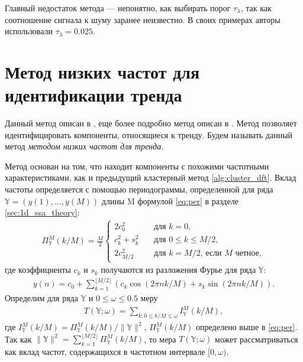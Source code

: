 \documentclass[specialist,
               substylefile = spbu.rtx,
               subf,href,colorlinks=true, 12pt]{disser}
\begin{document}
Главный недостаток метода --- непонятно, как выбирать порог  $\tau_\lambda$, так как соотношение сигнала к шуму заранее неизвестно.  В своих примерах авторы использовали $\tau_\lambda = 0.025$.

\section{Метод низких частот для идентификации тренда}
\label{sec:1d_freq_method}
Данный метод описан в \cite{Golyandina.Zhigljavsky2012}, еще более подробно метод описан в \cite{Alexandrov2006}. Метод позволяет идентифицировать компоненты, относящиеся к тренду. 
 Будем называть данный метод \textit{методом низких частот для тренда}.

Метод основан на том, что находит компоненты с похожими частотными характеристиками, как и предыдущий кластерный метод \ref{alg:cluster_dft}. Вклад частоты определяется с помощью периодограммы, определенной для ряда $\mathbb{Y}=(y(1),\ldots,y({M}))$ длины M формулой \eqref{eq:per} в разделе \ref{sec:1d_ssa_theory}:
\begin{gather*} 
 \Pi_{\mathbb{Y}}^M(k/M) = \frac{M}{2}
\begin{cases}
2c_0^2 &\quad \text{для } k = 0, \\
c_k^2 + s_k^2 & \quad \text{для }  0 \leqslant k \leqslant M/2, \\
2c_{M/2}^2 & \quad \text{для } k = M/2   \text{, если } M \text{ четное},
\end{cases} 
\end{gather*}
где коэффициенты $c_k$ и $s_k$ получаются из разложения Фурье для ряда $\mathbb{Y}$:
\begin{gather*}
y(n) = c_0 + \sum_{k=1}^{\lfloor M/2 \rfloor}\left(c_k\cos(2\pi n k /M) + s_k\sin(2\pi n k/M) \right).
\end{gather*}
Определим для ряда $\mathbb{Y}$ и $0 \leqslant  \omega \leqslant 0.5$ меру
\begin{gather}
\label{eq:T_measure}
T(\mathbb{Y}; \omega) = \sum_{k: 0 \leqslant k/M \leqslant \omega} I_{\mathbb{Y}}^M(k/M),
\end{gather}
где $I_{\mathbb{Y}}^M(k/M) = \Pi_{\mathbb{Y}}^M(k/M) / \|\mathbb{Y}\|^2$, $\Pi_{\mathbb{Y}}^M(k/M)$ определено выше в \eqref{eq:per}. Так как $\|\mathbb{Y}\|^2  = \sum_{k=1}^{\lfloor M/2 \rfloor} \Pi_{\mathbb{Y}}^M(k/M)$, то мера $T(\mathbb{Y}; \omega)$ может рассматриваться как вклад частот, содержащихся в частотном интервале $[0, \omega)$.
\end{document}

